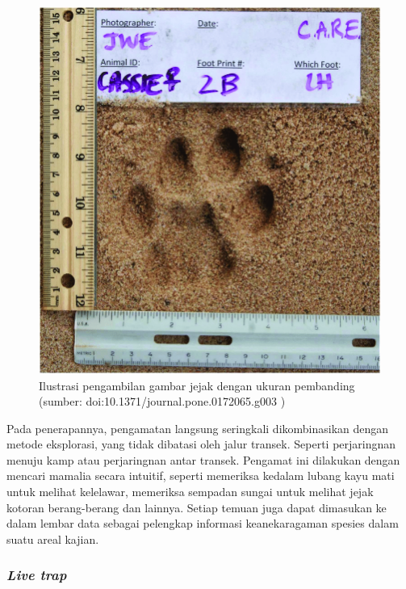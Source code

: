 \documentclass[
]{book}
\begin{document}
\begin{figure}

{\centering \includegraphics[width=1\linewidth]{images/pugmark} 

}

\caption{Ilustrasi pengambilan gambar jejak dengan ukuran pembanding (sumber: doi:10.1371/journal.pone.0172065.g003 )}\label{fig:pugm}
\end{figure}

Pada penerapannya, pengamatan langsung seringkali dikombinasikan dengan metode eksplorasi, yang tidak dibatasi oleh jalur transek. Seperti perjaringnan menuju kamp atau perjaringnan antar transek. Pengamat ini dilakukan dengan mencari mamalia secara intuitif, seperti memeriksa kedalam lubang kayu mati untuk melihat kelelawar, memeriksa sempadan sungai untuk melihat jejak kotoran berang-berang dan lainnya. Setiap temuan juga dapat dimasukan ke dalam lembar data sebagai pelengkap informasi keanekaragaman spesies dalam suatu areal kajian.

\hypertarget{live-trap}{%
\subsubsection*{\texorpdfstring{\emph{Live trap}}{Live trap}}\label{live-trap}}
\end{document}
